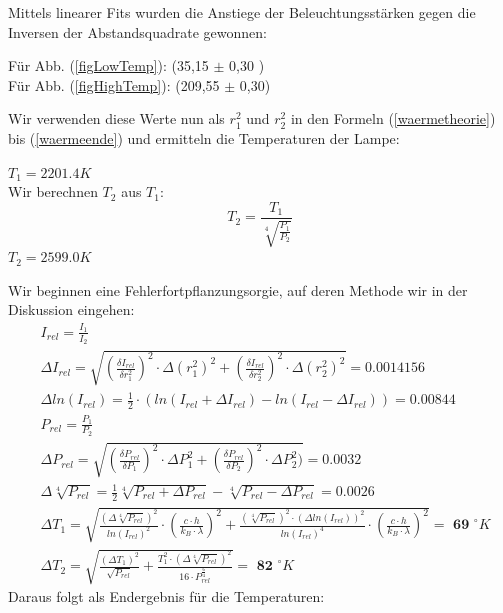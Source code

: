 \documentclass[12pt,a4paper,twopage]{article}
\begin{document}
Mittels linearer Fits wurden die Anstiege der Beleuchtungsstärken gegen die Inversen der Abstandsquadrate gewonnen:\\
\vspace{5mm}
\begin{center}
Für Abb. (\ref{figLowTemp}): \hspace{1cm}  (35,15 $\pm$ 0,30 ) \\
Für Abb. (\ref{figHighTemp}): \hspace{1cm} (209,55 $\pm$ 0,30) \\
\end{center}
\vspace{5mm}
Wir verwenden diese Werte nun als $r_1^2$ und $r_2^2$ in den Formeln (\ref{waermetheorie}) bis (\ref{waermeende}) und ermitteln die Temperaturen der Lampe: \\
\begin{center}
$T_1=2201.4 K$ \\
Wir berechnen $T_2$ aus $T_1$: \\
\begin{equation}
T_2=\frac{T_1}{\sqrt[4]{\frac{P_1}{P_2}}} 
\end{equation}
$T_2=2599.0 K$ \\
\end{center}
Wir beginnen eine Fehlerfortpflanzungsorgie, auf deren Methode wir in der Diskussion eingehen:
\begin{align*}
&I_{rel}=\frac{I_1}{I_2}\\
&\Delta I_{rel}=\sqrt{ \left(\frac{\delta I_{rel}}{\delta r_1^2}\right)^2 \cdot \Delta (r_1^2)^2 + \left(\frac{\delta I_{rel}}{\delta r_2^2}\right)^2 \cdot \Delta (r_2^2)^2 } = 0.0014156 \\
&\Delta ln (I_{rel})= \frac{1}{2} \cdot ( ln(I_{rel}+ \Delta I_{rel}) - ln ( I_{rel} - \Delta I_{rel}) ) =  0.00844\\
&P_{rel}=\frac{P_1}{P_2} \\
&\Delta P_{rel} = \sqrt{ \left(\frac{\delta P_{rel}}{\delta P_1}\right)^2 \cdot \Delta P_1^2 + \left(\frac{\delta P_{rel}}{\delta P_2}\right)^2 \cdot \Delta P_2^2)} =  0.0032 \\
&\Delta \sqrt[4]{P_{rel}} = \frac{1}{2}  \sqrt[4]{P_{rel}+ \Delta P_{rel}} -\sqrt[4]{P_{rel}-\Delta P_{rel}} = 0.0026 \\
&\Delta T_1 = \sqrt{ \frac{ (\Delta \sqrt[4]{P_{rel}})^2}{ln(I_{rel})^2} \cdot \left( \frac{c \cdot h}{k_B\cdot \lambda} \right) ^2 + \frac{ (\sqrt[4]{P_{rel}})^2 \cdot (\Delta ln(I_{rel}))^2}{ln(I_{rel})^4} \cdot \left( \frac{c \cdot h}{k_B \cdot \lambda}  \right) ^2} = \textbf{ 69 } ^{\circ} K \\
&\Delta T_2 = \sqrt{ \frac{ ( \Delta T_1)^2}{\sqrt{P_{rel}}} + \frac{T_1^2 \cdot ( \Delta \sqrt[4]{P_{rel}})^2}{16 \cdot P_{rel}^{\frac{6}{4}} } } = \textbf{ 82 } ^{\circ} K
\end{align*}
Daraus folgt als Endergebnis für die Temperaturen:
\begin{center}

\end{center}
\end{document}
